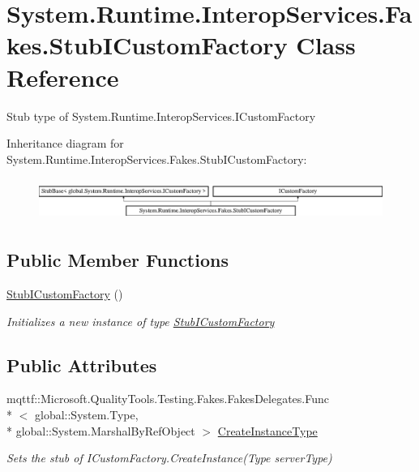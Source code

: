 \hypertarget{class_system_1_1_runtime_1_1_interop_services_1_1_fakes_1_1_stub_i_custom_factory}{\section{System.\-Runtime.\-Interop\-Services.\-Fakes.\-Stub\-I\-Custom\-Factory Class Reference}
\label{class_system_1_1_runtime_1_1_interop_services_1_1_fakes_1_1_stub_i_custom_factory}
}


Stub type of System.\-Runtime.\-Interop\-Services.\-I\-Custom\-Factory 


Inheritance diagram for System.\-Runtime.\-Interop\-Services.\-Fakes.\-Stub\-I\-Custom\-Factory\-:\begin{figure}[H]
\begin{center}
\leavevmode
\includegraphics[height=1.372549cm]{class_system_1_1_runtime_1_1_interop_services_1_1_fakes_1_1_stub_i_custom_factory}
\end{center}
\end{figure}
\subsection*{Public Member Functions}
\begin{DoxyCompactItemize}
\item 
\hyperlink{class_system_1_1_runtime_1_1_interop_services_1_1_fakes_1_1_stub_i_custom_factory_a4dae6115afd2a62b8f0591e2743a333a}{Stub\-I\-Custom\-Factory} ()
\begin{DoxyCompactList}\small\item\em Initializes a new instance of type \hyperlink{class_system_1_1_runtime_1_1_interop_services_1_1_fakes_1_1_stub_i_custom_factory}{Stub\-I\-Custom\-Factory}\end{DoxyCompactList}\end{DoxyCompactItemize}
\subsection*{Public Attributes}
\begin{DoxyCompactItemize}
\item 
mqttf\-::\-Microsoft.\-Quality\-Tools.\-Testing.\-Fakes.\-Fakes\-Delegates.\-Func\\*
$<$ global\-::\-System.\-Type, \\*
global\-::\-System.\-Marshal\-By\-Ref\-Object $>$ \hyperlink{class_system_1_1_runtime_1_1_interop_services_1_1_fakes_1_1_stub_i_custom_factory_a747cef3902d07d835cd79561fb886feb}{Create\-Instance\-Type}
\begin{DoxyCompactList}\small\item\em Sets the stub of I\-Custom\-Factory.\-Create\-Instance(\-Type server\-Type)\end{DoxyCompactList}\end{DoxyCompactItemize}


